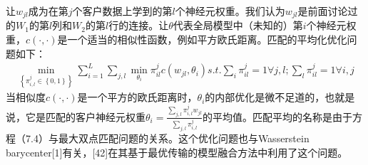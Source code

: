让$w_{jl}$成为在第$j$个客户数据上学到的第$l$个神经元权重。我们认为$w_{jl}$是前面讨论过的$W_{1}$的第$l$列和$W_{2}$的第$l$行的连接。让$\theta$代表全局模型中（未知的）第$i$个神经元权重，$c(\cdot, \cdot)$是一个适当的相似性函数，例如平方欧氏距离。匹配的平均化优化问题如下：
\begin{align}\label{eq:7.4}
	\min_{\left\{ \pi_{i,l}^{j} \in \left\{ 0, 1 \right\} \right\}} \sum_{i=1}^{L}\sum_{j,l} \min_{\theta_{i}} \pi_{il}^{j}c(w_{jl}, \theta_{i})s.t. \sum_{i}\pi_{il}^{j} = 1 \forall j, l; \sum_{l} \pi_{il}^{j} = 1 \forall i, j
\end{align}
当相似度$c(\cdot, \cdot)$是一个平方的欧氏距离时，$\theta_{i}$的内部优化是微不足道的，也就是说，它是匹配的客户神经元权重$\theta_{i} = \frac{\sum_{j,l}\pi_{i,l}^{j}w_{jl}}{\sum_{j,l}\pi_{i,l}^{j}}$的平均值。匹配平均的名称是由于方程（7.4）与最大双点匹配问题的关系。这个优化问题也与Wasserstein barycenter[1]有关，[42]在其基于最优传输的模型融合方法中利用了这个问题。